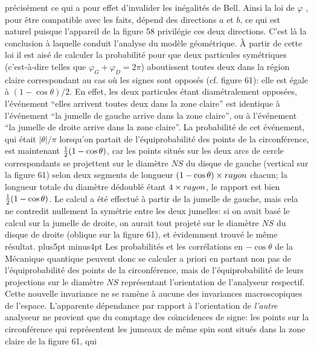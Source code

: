 pr\'ecis\'ement ce qui a pour effet d'invalider les in\'egalit\'es de Bell.
Ainsi la loi de $\varphi$ , pour \^etre compatible avec les faits,  
d\'epend des directions $a$ et $b$, ce qui est naturel puisque 
l'appareil de la figure 58 privil\'egie ces deux directions. C'est l\`a 
la conclusion \`a laquelle conduit l'analyse du mod\`ele g\'eom\'etrique. 
\medskip  
\`A partir de cette loi il est ais\'e de calculer la probabilit\'e pour que  
deux particules sym\'etriques (c'est-\`a-dire telles que $\varphi_G + 
\varphi_D = 2\pi$) aboutissent toutes deux dans la r\'egion claire 
correspondant au cas o\`u les signes sont oppos\'es (cf. figure 61): elle 
est \'egale \`a $(1 - \cos\theta ) / 2$. En effet, les deux particules 
\'etant diam\'etralement oppos\'ees, l'\'ev\'enement ``elles arrivent 
toutes deux dans  la zone claire'' est identique \`a l'\'ev\'enement ``la 
jumelle de gauche arrive dans la zone claire'', ou \`a l'\'ev\'enement ``la 
jumelle  de droite arrive dans la zone claire''. La probabilit\'e de cet 
\'ev\'enement, qui \'etait $|\theta | / \pi$ lorsqu'on partait de 
l'\'equiprobabilit\'e des points de la circonf\'erence, est maintenant 
${1 \over 2}(1  - \cos\theta )$, car les  points situ\'es sur les deux arcs  
de cercle correspondants se projettent sur le diam\`etre $NS$ du disque  
de gauche (vertical sur la figure 61) selon  deux segments de longueur  
$(1 - \cos\theta) \times {\sl rayon}$ chacun; la longueur totale du  
diam\`etre d\'edoubl\'e \'etant $4 \times {\sl rayon}$, le rapport est  
bien ${1\over 2}(1 - \cos\theta )$. Le calcul a \'et\'e effectu\'e \`a  
partir de la jumelle de gauche, mais cela ne  contredit nullement la 
sym\'etrie entre les deux jumelles: si on avait  bas\'e le calcul sur la  
jumelle de droite, on aurait tout projet\'e sur le diam\`etre $NS$ du 
disque de droite (oblique sur la figure 61), et \'evidemment trouv\'e le 
m\^eme r\'esultat.  
\vskip6pt plus5pt minus4pt 
Les probabilit\'es et les corr\'elations en $-\cos\theta$ de la M\'ecanique 
quantique peuvent donc se calculer a priori en partant non pas de 
l'\'equiprobabilit\'e des points de la circonf\'erence, mais de  
l'\'equiprobabilit\'e de leurs projections sur le diam\`etre $NS$  
repr\'esentant l'orientation de l'analyseur respectif. Cette nouvelle 
invariance ne se ram\`ene \`a aucune des invariances macroscopiques de 
l'espace. L'apparente d\'ependance par rapport \`a l'orientation de {\it  
l'autre} analyseur ne provient que du comptage des co\"\i ncidences 
de signe: les points sur la circonf\'erence qui repr\'esentent les jumeaux 
de m\^eme spin sont situ\'es dans la zone claire de la figure 61, qui 
